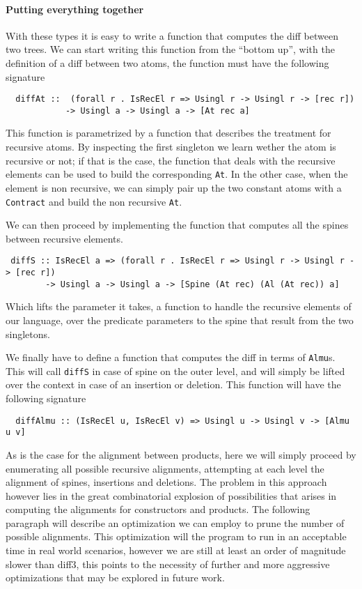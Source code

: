 \documentclass[11pt]{article}
\begin{document}
\paragraph{Putting everything together}\label{putting everything together}

With these types it is easy to write a function that computes the diff between 
two trees.
We can start writing this function from the ``bottom up'', 
with the definition of a diff between two atoms, the function must have the 
following signature
\begin{lstlisting}
  diffAt ::  (forall r . IsRecEl r => Usingl r -> Usingl r -> [rec r])
            -> Usingl a -> Usingl a -> [At rec a]
\end{lstlisting}
This function is parametrized by a function that describes the treatment for 
recursive atoms. By inspecting the first singleton we learn wether the atom is 
recursive or not; if that is the case, the function that deals with the 
recursive elements can be used to build the corresponding \texttt{At}. In the 
other case, when the element is non recursive, we can simply pair up the two 
constant atoms with a \texttt{Contract} and build the non recursive \texttt{At}.

We can then proceed by implementing the function that computes all the spines 
between recursive elements.
\begin{lstlisting}
 diffS :: IsRecEl a => (forall r . IsRecEl r => Usingl r -> Usingl r -> [rec r])
        -> Usingl a -> Usingl a -> [Spine (At rec) (Al (At rec)) a]
\end{lstlisting}
Which lifts the parameter it takes, a function to handle the 
recursive elements of our language, over the predicate parameters to the spine that result 
from the two singletons.

We finally have to define a function that computes the diff in terms of 
\texttt{Almu}s. This will call \texttt{diffS} in case of spine on the 
outer level, and will simply be lifted over the context in case of an insertion 
or deletion. This function will have the following signature

\begin{lstlisting}
  diffAlmu :: (IsRecEl u, IsRecEl v) => Usingl u -> Usingl v -> [Almu u v]
\end{lstlisting}

As is the case for the alignment between products, here we will simply proceed 
by enumerating all possible recursive alignments, attempting at each level 
the alignment of spines, insertions and deletions.
The problem in this approach however lies in the great combinatorial 
explosion of possibilities that arises in computing the alignments for 
constructors and products. The following paragraph will describe an optimization 
we can employ to prune the number of possible alignments. This optimization 
will the program to run in an acceptable time in real world scenarios, however 
we are still at least an order of magnitude slower than diff3, this points to 
the necessity of further and more aggressive optimizations that may be explored 
in future work.
\end{document}

